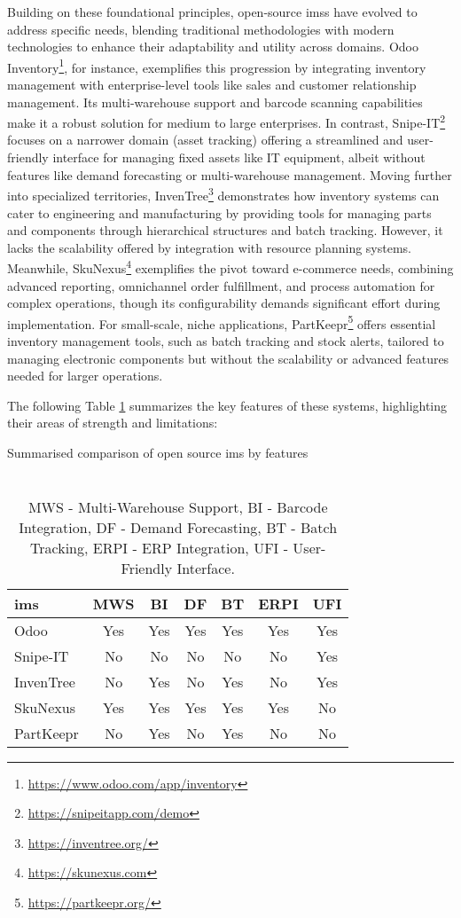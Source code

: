 Building on these foundational principles, open-source \acp{ims} have evolved to address specific needs, blending traditional methodologies with modern technologies to enhance their adaptability and utility across domains. Odoo Inventory\footnote{\url{https://www.odoo.com/app/inventory}}, for instance, exemplifies this progression by integrating inventory management with enterprise-level tools like sales and customer relationship management. Its multi-warehouse support and barcode scanning capabilities make it a robust solution for medium to large enterprises. In contrast, Snipe-IT\footnote{\url{https://snipeitapp.com/demo}} focuses on a narrower domain (asset tracking) offering a streamlined and user-friendly interface for managing fixed assets like IT equipment, albeit without features like demand forecasting or multi-warehouse management. Moving further into specialized territories, InvenTree\footnote{\url{https://inventree.org/}} demonstrates how inventory systems can cater to engineering and manufacturing by providing tools for managing parts and components through hierarchical structures and batch tracking. However, it lacks the scalability offered by integration with resource planning systems. Meanwhile, SkuNexus\footnote{\url{https://skunexus.com}} exemplifies the pivot toward e-commerce needs, combining advanced reporting, omnichannel order fulfillment, and process automation for complex operations, though its configurability demands significant effort during implementation. For small-scale, niche applications, PartKeepr\footnote{\url{https://partkeepr.org/}} offers essential inventory management tools, such as batch tracking and stock alerts, tailored to managing electronic components but without the scalability or advanced features needed for larger operations.

The following Table \ref{table:ims_comparison} summarizes the key features of these systems, highlighting their areas of strength and limitations:

\begin{table}[!htb]
\centering
\caption{Summarised comparison of open source \acl{ims} by features}
\begin{tabular}{|l|c|c|c|c|c|c|}
\hline
\textbf{\ac{ims}} & \textbf{MWS} & \textbf{BI} & \textbf{DF} & \textbf{BT} & \textbf{ERPI} & \textbf{UFI} \\
\hline
Odoo & Yes & Yes & Yes & Yes & Yes & Yes \\
\hline
Snipe-IT & No  & No  & No  & No  & No  & Yes \\
\hline
InvenTree & No  & Yes & No  & Yes & No  & Yes \\
\hline
SkuNexus & Yes & Yes & Yes & Yes & Yes & No  \\
\hline
PartKeepr & No  & Yes & No  & Yes & No  & No  \\
\hline
\end{tabular}
\caption*{\\MWS - Multi-Warehouse Support, BI - Barcode Integration, DF - Demand Forecasting, BT - Batch Tracking, ERPI - ERP Integration, UFI - User-Friendly Interface.}
\label{table:ims_comparison}
\end{table}

